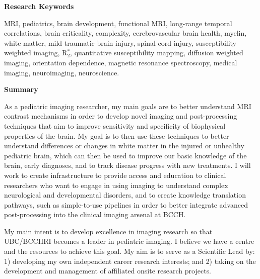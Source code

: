 \documentclass[11pt,notitlepage,english]{report}
\begin{document}
\noindent \textbf{Research Keywords}

\noindent MRI, pediatrics, brain development, functional MRI, long-range temporal correlations, brain criticality, complexity, cerebrovascular brain health, myelin, white matter, mild traumatic brain injury, spinal cord injury, susceptibility weighted imaging, R$_{2}^{*}$, quantitative susceptibility mapping, diffusion weighted imaging, orientation dependence, magnetic resonance spectroscopy, medical imaging, neuroimaging, neuroscience.

\vspace{5pt}

\noindent \textbf{Summary}


As a pediatric imaging researcher, my main goals are to better understand MRI contrast mechanisms in order to develop novel imaging and post-processing techniques that aim to improve sensitivity and specificity of biophysical properties of the brain. My goal is to then use these techniques to better understand differences or changes in white matter in the injured or unhealthy pediatric brain, which can then be used to improve our basic knowledge of the brain, early diagnoses, and to track disease progress with new treatments. I will work to create infrastructure to provide access and education to clinical researchers who want to engage in using imaging to understand complex neurological and developmental disorders, and to create knowledge translation pathways, such as simple-to-use pipelines in order to better integrate advanced post-processing into the clinical imaging arsenal at BCCH.

My main intent is to develop excellence in imaging research so that UBC/BCCHRI becomes a leader in pediatric imaging. I believe we have a centre and the resources to achieve this goal. My aim is to serve as a Scientific Lead by: 1) developing my own independent career research interests; and 2) taking on the development and management of affiliated onsite research projects.
\end{document}
